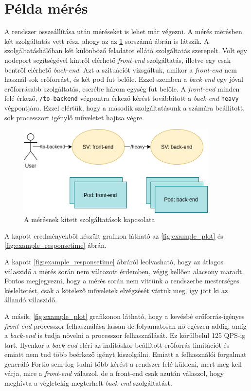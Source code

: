 \section{Példa mérés}
A rendszer összeállítása után méréseket is lehet már végezni. A mérés mérésben két szolgáltatás vett rész, ahogy az az \ref{fig:sample_sg} sorszámú ábrán is látszik. A szolgáltatáshálóban két különböző feladatot ellátó szolgáltatás szerepelt. Volt egy nodeport segítségével kintről elérhető \textit{front-end} szolgáltatás, illetve egy csak bentről elérhető \textit{back-end}. Azt a szituációt vizsgáltuk, amikor a \textit{front-end} nem használ sok erőforrást, és két pod fut belőle. Ezzel szemben a \textit{back-end} egy jóval erőforrásabb szolgáltatás, cserébe három egység fut belőle. A \textit{front-end} minden felé érkező, \verb+/to-backend+ végpontra érkező kérést továbbított a \textit{back-end} \verb+heavy+ végpontjára. Ezzel elértük, hogy a második szolgáltatásunk a számára beállított, sok processzort igénylő műveletet hajtsa végre.


\begin{figure}[!ht]
\centering
\includegraphics[width=100mm, keepaspectratio]{figures/sample_measurement.png}
\caption{A mérésnek kitett szolgáltatások kapcsolata}
\label{fig:sample_sg}
\end{figure}

A kapott eredményekből készült grafikon látható az \ref{fig:example_plot} és \ref{fig:example_responsetime} ábrán. 

A kapott \ref{fig:example_responsetime} ábráról leolvasható, hogy az átlagos válaszidő a mérés során nem változott érdemben, végig kellően alacsony maradt. Fontos megjegyezni, hogy a mérés során nem vittünk a rendszerbe mesterséges késleltetést, csak a kötelező műveletek elvégzését vártuk meg, így jött ki az állandó válaszidő.

A másik, \ref{fig:example_plot} grafikonon látható, hogy a kevésbé erőforrás-igényes \textit{front-end} processzor felhasználása lassan de folyamatosan nő egészen addig, amíg a \textit{back-end} is tudja növelni a processzor felhasználását. Ez körülbelül 125 QPS-ig tart. Ilyenkor a \textit{back-end} eléri az indításkor beállított erőforrás limitációt és emiatt nem tud több beérkező igényt kiszolgálni.  Emiatt a felhasználói forgalmat generáló Fortio sem fog tudni több kérést a rendszer felé küldeni, mert meg kell várja, mire a \textit{front-end} válaszol, de a front-end csak azután válaszol, hogy meghívta a végletekig megterhelt \textit{back-end} szolgáltatást.

